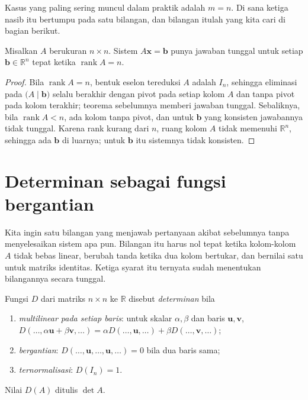Kasus yang paling sering muncul dalam praktik adalah $m=n$. Di sana ketiga nasib itu
bertumpu pada satu bilangan, dan bilangan itulah yang kita cari di bagian berikut.

\begin{akibat}
Misalkan $A$ berukuran $n\times n$. Sistem $A\mathbf{x}=\mathbf{b}$ punya jawaban tunggal
untuk setiap $\mathbf{b}\in\mathbb{R}^{n}$ tepat ketika $\operatorname{rank}A=n$.
\end{akibat}

\begin{proof}
Bila $\operatorname{rank}A=n$, bentuk eselon tereduksi $A$ adalah $I_{n}$, sehingga
eliminasi pada $\bigl(A\mid\mathbf{b}\bigr)$ selalu berakhir dengan pivot pada setiap kolom
$A$ dan tanpa pivot pada kolom terakhir; teorema sebelumnya memberi jawaban tunggal.
Sebaliknya, bila $\operatorname{rank}A<n$, ada kolom tanpa pivot, dan untuk $\mathbf{b}$ yang
konsisten jawabannya tidak tunggal. Karena rank kurang dari $n$, ruang kolom $A$ tidak
memenuhi $\mathbb{R}^{n}$, sehingga ada $\mathbf{b}$ di luarnya; untuk $\mathbf{b}$ itu
sistemnya tidak konsisten.
\end{proof}

\section{Determinan sebagai fungsi bergantian}

Kita ingin satu bilangan yang menjawab pertanyaan akibat sebelumnya tanpa menyelesaikan
sistem apa pun. Bilangan itu harus nol tepat ketika kolom-kolom $A$ tidak bebas linear,
berubah tanda ketika dua kolom bertukar, dan bernilai satu untuk matriks identitas. Ketiga
syarat itu ternyata sudah menentukan bilangannya secara tunggal.


\begin{definisi}[Determinan]
Fungsi $D$ dari matriks $n\times n$ ke $\mathbb{R}$ disebut \emph{determinan} bila
\begin{enumerate}
  \item \emph{multilinear pada setiap baris}: untuk skalar $\alpha,\beta$ dan baris
        $\mathbf{u},\mathbf{v}$,
        $D(\dots,\alpha\mathbf{u}+\beta\mathbf{v},\dots)
         =\alpha D(\dots,\mathbf{u},\dots)+\beta D(\dots,\mathbf{v},\dots)$;
  \item \emph{bergantian}: $D(\dots,\mathbf{u},\dots,\mathbf{u},\dots)=0$ bila dua baris
        sama;
  \item \emph{ternormalisasi}: $D(I_{n})=1$.
\end{enumerate}
Nilai $D(A)$ ditulis $\det A$.
\end{definisi}


